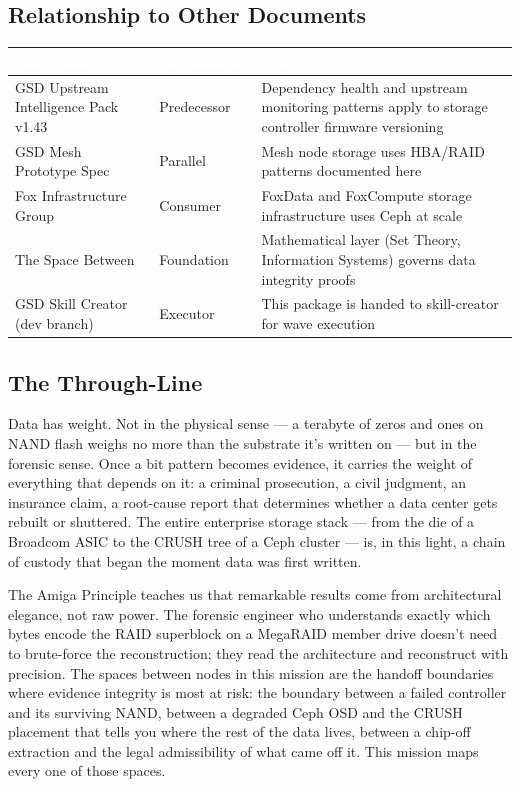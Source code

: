 \documentclass[11pt,letterpaper]{article}
\newcommand{\tableheader}[1]{\textbf{\sffamily\textcolor{white}{#1}}}
\begin{document}
\subsection{Relationship to Other Documents}

\begin{center}
\begin{tabularx}{\textwidth}{L{4cm}L{3cm}X}
\toprule
{}
\tableheader{Document} & \tableheader{Relationship} & \tableheader{Notes} \\
\midrule
GSD Upstream Intelligence Pack v1.43 & Predecessor & Dependency health and upstream monitoring patterns apply to storage controller firmware versioning \\
GSD Mesh Prototype Spec & Parallel & Mesh node storage uses HBA/RAID patterns documented here \\
Fox Infrastructure Group & Consumer & FoxData and FoxCompute storage infrastructure uses Ceph at scale \\
The Space Between & Foundation & Mathematical layer (Set Theory, Information Systems) governs data integrity proofs \\
GSD Skill Creator (dev branch) & Executor & This package is handed to skill-creator for wave execution \\
\bottomrule
\end{tabularx}
\end{center}

\subsection{The Through-Line}

Data has weight. Not in the physical sense --- a terabyte of zeros and ones on NAND flash weighs no more than the substrate it's written on --- but in the forensic sense. Once a bit pattern becomes evidence, it carries the weight of everything that depends on it: a criminal prosecution, a civil judgment, an insurance claim, a root-cause report that determines whether a data center gets rebuilt or shuttered. The entire enterprise storage stack --- from the die of a Broadcom ASIC to the CRUSH tree of a Ceph cluster --- is, in this light, a chain of custody that began the moment data was first written.

The Amiga Principle teaches us that remarkable results come from architectural elegance, not raw power. The forensic engineer who understands exactly which bytes encode the RAID superblock on a MegaRAID member drive doesn't need to brute-force the reconstruction; they read the architecture and reconstruct with precision. The spaces between nodes in this mission are the handoff boundaries where evidence integrity is most at risk: the boundary between a failed controller and its surviving NAND, between a degraded Ceph OSD and the CRUSH placement that tells you where the rest of the data lives, between a chip-off extraction and the legal admissibility of what came off it. This mission maps every one of those spaces.
\end{document}
